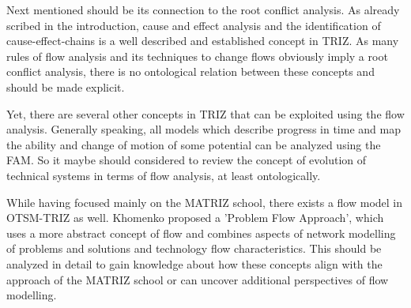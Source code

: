 \documentclass[a4paper,11pt]{article}
\begin{document}
        Next mentioned should be its connection to the root conflict analysis. 
        As already scribed in the introduction, cause and effect analysis and 
        the identification of cause-effect-chains is a well described and 
        established concept in TRIZ. As many rules of flow analysis and its
        techniques to change flows obviously imply a root conflict analysis, 
        there is no ontological relation between these concepts and should be 
        made explicit. 
        
        Yet, there are several other concepts in TRIZ that can be exploited 
        using the flow analysis. Generally speaking, all models which describe 
        progress in time and map the ability and change of motion of some 
        potential can be analyzed using the FAM. So it maybe should considered 
        to review the concept of evolution of technical systems in terms of 
        flow analysis, at least ontologically.
        
        While having focused mainly on the MATRIZ school, there exists a flow 
        model in OTSM-TRIZ as well. Khomenko proposed a 'Problem Flow Approach',
        which uses a more abstract concept of flow and combines aspects of 
        network modelling of problems and solutions and technology flow 
        characteristics. \cite{Khomenko2007} \cite{KhomenkoProblemFlowNetworks}
        \cite{KhomenkoTechnologyProblemFlow} \cite{KhomenkoProblemFlowModel}
        This should be analyzed in detail to gain knowledge about how these 
        concepts align with the approach of the MATRIZ school or can uncover 
        additional perspectives of flow modelling.        
\end{document}

